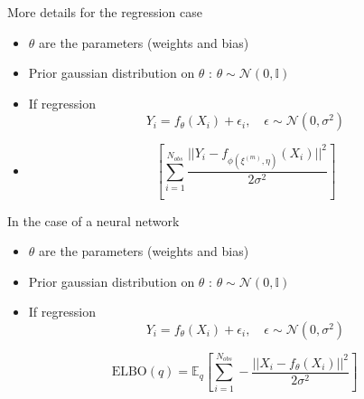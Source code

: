 \documentclass[
  ignorenonframetext,
]{beamer}
\providecommand{\tightlist}{%
  \setlength{\itemsep}{0pt}\setlength{\parskip}{0pt}}
\begin{document}
\begin{frame}{More details for the regression case}
\protect\hypertarget{more-details-for-the-regression-case}{}
\begin{itemize}
\item
  \(\theta\) are the parameters (weights and bias)
\item
  Prior gaussian distribution on \(\theta\) :
  \(\theta \sim \mathcal{N}(0, \mathbb{I})\)
\item
  If regression
  \[Y_i = f_\theta(X_i) + \epsilon_i, \quad \epsilon \sim \mathcal{N}(0,\sigma^2)\]
\item
  \[\left[\sum_{i=1}^{N_{obs}}   \frac{||Y_i - f_{ \phi(\xi^{(m)},\eta) }(X_i)||^2}{2\sigma^2}\right]\]
\end{itemize}
\end{frame}

\begin{frame}{In the case of a neural network}
\protect\hypertarget{in-the-case-of-a-neural-network}{}
\begin{itemize}
\tightlist
\item
  \(\theta\) are the parameters (weights and bias)
\item
  Prior gaussian distribution on \(\theta\) :
  \(\theta \sim \mathcal{N}(0, \mathbb{I})\)
\item
  If regression
  \[Y_i = f_\theta(X_i) + \epsilon_i, \quad \epsilon \sim \mathcal{N}(0,\sigma^2)\]
\end{itemize}

\[\text{ELBO}(q) = \mathbb{E}_{q}  \left[\sum_{i=1}^{N_{obs}} - \frac{||X_i - f_{\theta}(X_i)||^2}{2\sigma^2}\right]\]
\end{frame}
\end{document}
